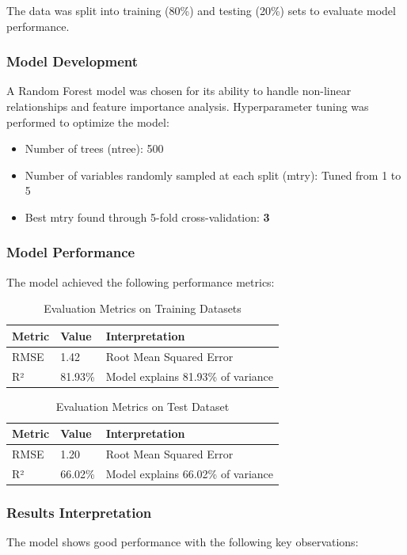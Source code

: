 The data was split into training (80\%) and testing (20\%) sets to evaluate model performance.

\subsubsection{Model Development}
A Random Forest model was chosen for its ability to handle non-linear relationships and feature importance analysis. Hyperparameter tuning was performed to optimize the model:

\begin{itemize}
    \item Number of trees (ntree): 500
    \item Number of variables randomly sampled at each split (mtry): Tuned from 1 to 5
    \item Best mtry found through 5-fold cross-validation: \textbf{3}
\end{itemize}

\subsubsection{Model Performance}
The model achieved the following performance metrics:

\begin{table}[h]
\centering
\caption{Evaluation Metrics on Training Datasets}
\begin{tabular}{lll}
\toprule
\textbf{Metric} & \textbf{Value} & \textbf{Interpretation} \\
\midrule
RMSE & 1.42 & Root Mean Squared Error \\
R² & 81.93\% & Model explains 81.93\% of variance\\
\bottomrule
\end{tabular}
\end{table}

\begin{table}[h]
\centering
\caption{Evaluation Metrics on Test Dataset}
\begin{tabular}{lll}
\toprule
\textbf{Metric} & \textbf{Value} & \textbf{Interpretation} \\
\midrule
RMSE & 1.20 & Root Mean Squared Error \\
R² & 66.02\% & Model explains 66.02\% of variance\\
\bottomrule
\end{tabular}
\end{table}

\subsubsection{Results Interpretation}
The model shows good performance with the following key observations:


